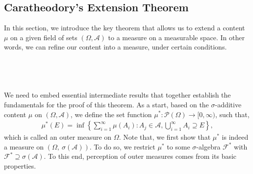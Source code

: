 \documentclass{article}
\begin{document}
\subsection{Caratheodory's Extension Theorem}
In this section, we introduce the key theorem that allows us to extend a content $\mu$ on a given field of sets $(\Omega, \mathcal{A})$ to a measure on a measurable space. In other words, we can refine our content into a measure, under certain conditions.\\\\
\noindent{}\\\\\\
We need to embed essential intermediate results that together establish the fundamentals for the proof of this theorem. As a start, based on the $\sigma$-additive content $\mu$ on $(\Omega, \mathcal{A})$, we define the set function $\mu^{*}: \mathcal{P}(\Omega) \to [0, \infty)$, such that, 
\begin{eqnarray}
	\nonumber
	\mu^{*}(E) = \inf\left\{\sum_{i=1}^{\infty}\mu(A_i): A_j \in \mathcal{A}, \bigcup_{i=1}^{\infty}A_i \supseteq E\right\},
\end{eqnarray}
which is called an outer measure on $\Omega$. Note that, we first show that $\mu^{*}$ is indeed a measure on $(\Omega, \ \sigma(\mathcal{A}))$. To do so, we restrict $\mu^{*}$ to some $\sigma$-algebra $\mathcal{F}^{*}$ with $\mathcal{F}^{*} \supseteq \sigma(\mathcal{A})$. To this end, perception of outer measures comes from its basic properties.\\\\
\noindent{}\\\\\\
\end{document}
